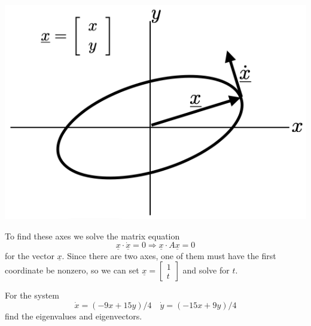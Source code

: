 \documentclass[12pt,letterpaper]{exam}
\begin{document}
\begin{questions}
 \includegraphics[scale=0.5]{img/PSet03_ellipse.png}
 
   To find these axes we solve the matrix equation 
	\[\underline{x}\cdot \dot{\underline{x}}=0\Rightarrow \underline{x}\cdot A\underline{x}=0\]
	for the vector $\underline{x}$.  Since there are two axes, one of them must have the first coordinate be nonzero, so we can set $\underline{x}=\left[\begin{array}{c}1\\t\end{array}\right]$ and solve for $t$.

	\begin{parts}
	\item 
 
 For the system
	\[\dot x=(-9x+15y)/4\quad \dot y=(-15x+9y)/4\]
	find the eigenvalues and eigenvectors.  
 

\end{parts}
\end{questions}
\end{document}
